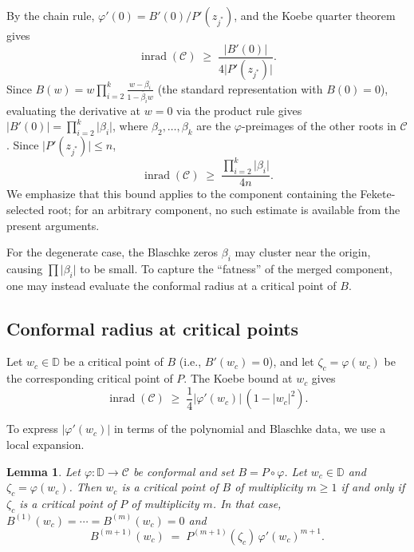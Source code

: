 \documentclass[11pt,a4paper]{amsart}
\newtheorem{lemma}[theorem]{Lemma}
\theoremstyle{definition}
\newcommand{\D}{\mathbb{D}}
\newcommand{\abs}[1]{\lvert #1 \rvert}
\newcommand{\inrad}{\operatorname{inrad}}
\begin{document}
By the chain rule, $\varphi'(0) = B'(0)/P'(z_{j^*})$, and the
Koebe quarter theorem gives
\begin{equation}\label{eq:blaschke-inradius}
  \inrad(\mathcal{C}) \;\geq\; \frac{\abs{B'(0)}}{4\abs{P'(z_{j^*})}}.
\end{equation}
Since $B(w) = w \prod_{i=2}^k \frac{w - \beta_i}{1 - \bar\beta_i w}$
(the standard representation with $B(0) = 0$),
evaluating the derivative at $w = 0$ via the product rule gives
$\abs{B'(0)} = \prod_{i=2}^k \abs{\beta_i}$, where $\beta_2,
\ldots, \beta_k$ are the $\varphi$-preimages of the other roots in
$\mathcal{C}$.  Since $\abs{P'(z_{j^*})} \leq n$,
\[
  \inrad(\mathcal{C}) \;\geq\;
  \frac{\prod_{i=2}^k \abs{\beta_i}}{4n}.
\]
We emphasize that this bound applies to the component containing the
Fekete-selected root; for an arbitrary component, no such estimate is
available from the present arguments.

For the degenerate case, the Blaschke zeros $\beta_i$ may cluster
near the origin, causing $\prod\abs{\beta_i}$ to be small.
To capture the ``fatness'' of the merged component, one may instead
evaluate the conformal radius at a critical point of $B$.

\subsection{Conformal radius at critical points}

Let $w_c \in \D$ be a critical point of $B$ (i.e., $B'(w_c) = 0$),
and let $\zeta_c = \varphi(w_c)$ be the corresponding critical point
of $P$.  The Koebe bound at $w_c$ gives
\begin{equation}\label{eq:crit-koebe}
  \inrad(\mathcal{C}) \;\geq\;
  \frac{1}{4}\abs{\varphi'(w_c)}\,(1 - \abs{w_c}^2).
\end{equation}

To express $\abs{\varphi'(w_c)}$ in terms of the polynomial and Blaschke
data, we use a local expansion.

\begin{lemma}\label{lem:local-multiplicity}
Let $\varphi \colon \D \to \mathcal{C}$ be conformal and set
$B = P \circ \varphi$.  Let $w_c \in \D$ and $\zeta_c = \varphi(w_c)$.
Then $w_c$ is a critical point of $B$ of multiplicity $m \geq 1$
if and only if $\zeta_c$ is a critical point of $P$ of multiplicity $m$.
In that case,
$B^{(1)}(w_c) = \cdots = B^{(m)}(w_c) = 0$ and
\begin{equation}\label{eq:faa-di-bruno}
  B^{(m+1)}(w_c) \;=\; P^{(m+1)}(\zeta_c)\,\varphi'(w_c)^{m+1}.
\end{equation}
\end{lemma}
\end{document}
